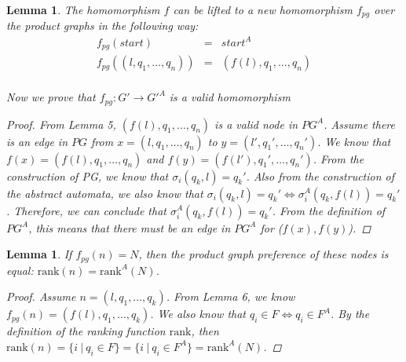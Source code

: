 \documentclass[twocolumn, openany]{sig-alternate-10pt}
\newcommand{\Rank}{\ensuremath{\mathrm{rank}}}
\newtheorem{lem}[thm]{Lemma}
\begin{document}
\begin{lem}
  The homomorphism $f$ can be lifted to a new homomorphism $f_{pg}$ over the product graphs in the following way:
  \[ \begin{array}{rcl}
    f_{pg}( start ) & = & start^A  \\
    f_{pg}( (l,q_1,\ldots,q_n) ) & = & (f(l),q_1,\ldots,q_n) \\
  \end{array} \]

  Now we prove that $f_{pg}: G' \rightarrow G'^A$ is a valid homomorphism
  \begin{proof}
    From Lemma 5, $(f(l),q_1,\ldots,q_n)$ is a valid node in $PG^A$. 
    Assume there is an edge in $PG$ from $x=(l,q_1,\ldots,q_n)$
    to $y=(l',q_1',\ldots,q_n')$. We know that $f(x) = (f(l),q_1,\ldots,q_n)$ and $f(y) = (f(l'),q_1',\ldots,q_n')$.
    From the construction of PG, we know that $\sigma_i(q_k, l) = q_k'$. 
    Also from the construction of the abstract automata, we also know that $\sigma_i(q_k, l) = q_k' \iff \sigma^A_i(q_k, f(l)) = q_k'$. Therefore, we can conclude that $\sigma^A_i(q_k, f(l)) = q_k'$. From the definition of $PG^A$, this means that there must be an edge in $PG^A$ for ($f(x),f(y)$).
  \end{proof}
\end{lem}


\begin{lem}
  If $f_{pg}(n) = N$, then the product graph preference of these nodes is equal: $\Rank(n) = \Rank^A(N)$.

  \begin{proof}
    Assume $n = (l,q_1,\dots,q_k)$. From Lemma 6, we know $f_{pg}(n) = (f(l),q_1,\dots,q_k)$. 
    We also know that $q_i \in F \iff q_i \in F^A$. 
    By the definition of the ranking function $\Rank$, then 
    $\Rank(n) = \{ i ~\vert~ q_i \in F \} = \{ i ~\vert~ q_i \in F^A \} = \Rank^A(N)$.
  \end{proof}

\end{lem}


\end{document}
